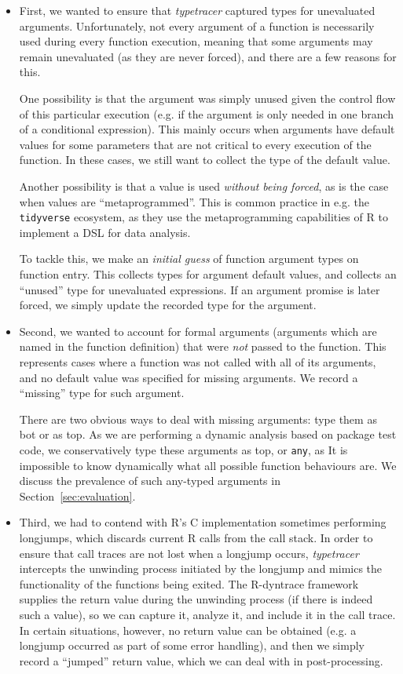 \documentclass[acmsmall,review,anonymous]{acmart}\settopmatter{printfolios=true,printccs=false,printacmref=false}
\newcommand{\code}[1]{{\lstinline[style=Rin]!#1!}\xspace}
\newcommand{\typetracer}{\emph{typetracer}\xspace} %
\begin{document}
\begin{itemize}

\item First, we wanted to ensure that \typetracer captured types for
  unevaluated arguments.  Unfortunately, not every argument of a function is
  necessarily used during every function execution, meaning that some
  arguments may remain unevaluated (as they are never forced), and there are
  a few reasons for this.

  One possibility is that the argument was simply unused given the control
  flow of this particular execution (e.g. if the argument is only needed in
  one branch of a conditional expression).  This mainly occurs when
  arguments have default values for some parameters that are not critical to
  every execution of the function.  In these cases, we still want to collect
  the type of the default value.

  Another possibility is that a value is used {\it without being forced}, as
  is the case when values are ``metaprogrammed''.  This is common practice
  in e.g. the \code{tidyverse} ecosystem, as they use the metaprogramming
  capabilities of R to implement a DSL for data analysis.

To tackle this, we make an {\it initial guess} of function argument types on
function entry. This collects types for argument default values, and
collects an ``unused'' type for unevaluated expressions.  If an argument
promise is later forced, we simply update the recorded type for the
argument.

\item Second, we wanted to account for formal arguments (arguments which are
  named in the function definition) that were {\it not} passed to the
  function. This represents cases where a function was not called with all of its
  arguments, and no default value was specified for missing arguments. 
  We record a ``missing'' type for such argument.

There are two obvious ways to deal with missing arguments: type them as bot
or as top.  As we are performing a dynamic analysis based on package test
code, we conservatively type these arguments as top, or \code{any}, as It is
impossible to know dynamically what all possible function behaviours are.
We discuss the prevalence of such any-typed arguments in
Section~\ref{sec:evaluation}.

\item Third, we had to contend with R's C implementation sometimes
  performing longjumps, which discards current R calls from the call stack.
  In order to ensure that call traces are not lost when a longjump occurs,
  \typetracer intercepts the unwinding process initiated by the longjump and
  mimics the functionality of the functions being exited.  The R-dyntrace
  framework supplies the return value during the unwinding process (if there
  is indeed such a value), so we can capture it, analyze it, and include it
  in the call trace.  In certain situations, however, no return value can be
  obtained (e.g. a longjump occurred as part of some error handling), and
  then we simply record a ``jumped'' return value, which we can deal with in
  post-processing.  
\end{itemize}
\end{document}
